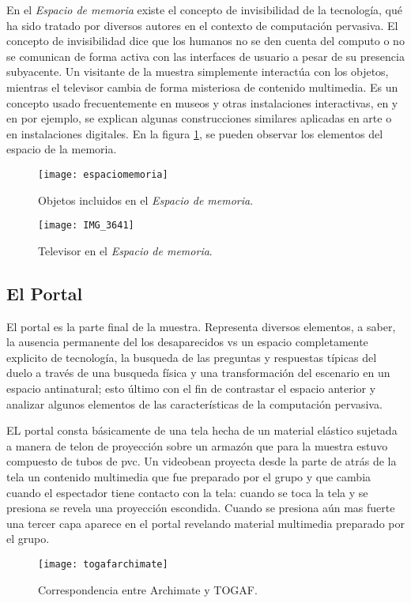 En el \textit{Espacio de memoria} existe el concepto de invisibilidad de la tecnología\cite{RN13,weiser1991computer,RN23,RN14}, qué ha sido tratado por diversos autores en el contexto de computación pervasiva. El concepto de invisibilidad dice que los humanos no se den cuenta del computo o no se comunican de forma activa con las interfaces de usuario a pesar de su presencia subyacente. Un visitante de la muestra simplemente interactúa con los objetos, mientras el televisor cambia de forma misteriosa de contenido multimedia. Es un concepto usado frecuentemente en museos y otras instalaciones interactivas, en \cite{RN31} y en \cite{RN34} por ejemplo, se explican algunas construcciones similares aplicadas en arte o en instalaciones digitales. En la figura \ref{espaciomemoriaimg}, se pueden observar los elementos del espacio de la memoria.

\begin{figure}[h]
\label{espaciomemoriaimg}
\centering
\texttt{[image: espaciomemoria]}
\caption{Objetos incluidos en el \textit{Espacio de memoria}.}
\end{figure}

\begin{figure}[h]
\label{televisorimg}
\centering
\texttt{[image: IMG\_3641]}
\caption{Televisor en el \textit{Espacio de memoria}.}
\end{figure}

\subsection{El Portal}

El portal es la parte final de la muestra. Representa diversos elementos, a saber, la ausencia permanente del los desaparecidos vs un espacio completamente explicito de tecnología, la busqueda de las preguntas y respuestas típicas del duelo a través de una busqueda física y una transformación del escenario en un espacio antinatural; esto último con el fin de contrastar el espacio anterior y analizar algunos elementos de las características de la computación pervasiva.

EL portal consta básicamente de una tela hecha de un material elástico sujetada a manera de telon de proyección sobre un armazón que para la muestra estuvo compuesto de tubos de pvc. Un videobean proyecta desde la parte de atrás de la tela un contenido multimedia que fue preparado por el grupo y que cambia cuando el espectador tiene contacto con la tela: cuando se toca la tela y se presiona se revela una proyección escondida. Cuando se presiona aún mas fuerte una tercer capa aparece en el portal revelando material multimedia preparado por el grupo. 

\begin{figure}[h]\label{togafarchimate}
\centering
\texttt{[image: togafarchimate]}
\caption{Correspondencia entre Archimate y TOGAF.}
\end{figure}
